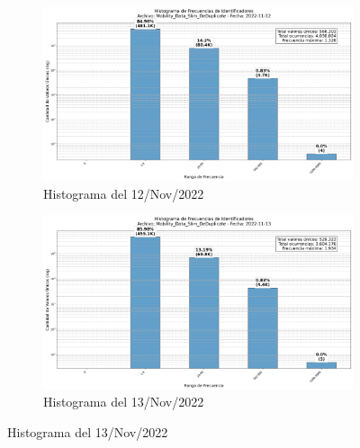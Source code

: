 \begin{figure}[H]
    \begin{subfigure}[t]{0.48\textwidth-1em}
        \includegraphics[width=\linewidth]{img/daily_histograms/histograma_identifier_Mobility_Data_Slim_DeDuplicate_2022-11-12.png}
        \caption{Histograma del 12/Nov/2022}
        \label{fig:sub7}
    \end{subfigure}
    \hfill
    \begin{subfigure}[t]{0.48\textwidth-1em}
        \includegraphics[width=\linewidth]{img/daily_histograms/histograma_identifier_Mobility_Data_Slim_DeDuplicate_2022-11-13.png}
        \caption{Histograma del 13/Nov/2022}
        \label{fig:sub8}
    \end{subfigure}

    \vspace{0.5cm}


\end{figure}
